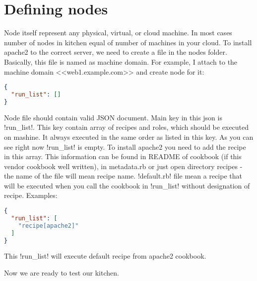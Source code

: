 \section{Defining nodes}
\label{sec:solo-node}

Node itself represent any physical, virtual, or cloud machine. In most cases number of nodes in kitchen equal of number of machines in your cloud. To install apache2 to the correct server, we need to create a file in the nodes folder. Basically, this file is named as machine domain. For example, I attach to the machine domain <<web1.example.com>> and create node for it:

\begin{lstlisting}[language=JSON,label=lst:my-cloud-node1,title=my-cloud/nodes/web1.example.com.json]
{
  "run_list": []
}
\end{lstlisting}

Node file should contain valid JSON document. Main key in this json is \inline!run_list!. This key contain array of recipes and roles, which should be executed on mashine. It always executed in the same order as listed in this key. As you can see right now \inline!run_list! is empty. To install apache2 you need to add the recipe in this array. This information can be found in README of cookbook (if this vendor cookbook well written), in metadata.rb or just open directory recipes - the name of the file will mean recipe name. \inline!default.rb! file mean a recipe that will be executed when you call the cookbook in \inline!run_list! without designation of recipe. Examples:

\begin{lstlisting}[language=JSON,label=lst:my-cloud-node2,title=my-cloud/nodes/web1.example.com.json]
{
  "run_list": [
    "recipe[apache2]"
  ]
}
\end{lstlisting}

This \inline!run_list! will execute default recipe from apache2 cookbook.

Now we are ready to test our kitchen.
